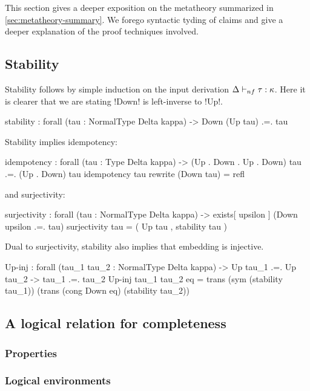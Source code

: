 \documentclass[sigplan,10pt,review]{acmart}\settopmatter{printfolios=true,printccs=false,printacmref=false}
\begin{document}
This section gives a deeper exposition on the metatheory summarized in \cref{sec:metatheory-summary}. We forego syntactic tyding of claims and give a deeper explanation of the proof techniques involved.

\subsection{Stability}

Stability follows by simple induction on the input derivation $\Delta \vdash_{nf} \tau : \kappa$. Here it is clearer that we are stating !Down! is left-inverse to !Up!.

\begin{agda}
stability : forall (tau : NormalType Delta kappa) -> Down (Up tau) .=. tau
\end{agda}
Stability implies idempotency:
\begin{agda}
idempotency : forall (tau : Type Delta kappa) -> 
              (Up . Down . Up . Down) tau .=. (Up . Down) tau
idempotency tau rewrite (Down tau) = refl
\end{agda}
\Ni and surjectivity: 

\begin{agda}
surjectivity : forall (tau : NormalType Delta kappa) -> 
               exists[ upsilon ] (Down upsilon .=. tau)
surjectivity tau = ( Up tau , stability tau )
\end{agda}

Dual to surjectivity, stability also implies that embedding is injective.

\begin{agda}
Up-inj : forall (tau_1  tau_2 : NormalType Delta kappa) -> 
         Up tau_1 .=. Up tau_2 -> tau_1 .=. tau_2
Up-inj  tau_1  tau_2  eq = 
  trans 
    (sym (stability tau_1))          
    (trans 
      (cong Down eq)
      (stability tau_2))
\end{agda}

\subsection{A logical relation for completeness}

\subsubsection{Properties}

\subsubsection{Logical environments}
\end{document}

